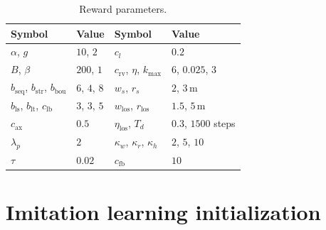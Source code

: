 \documentclass[11pt,a4paper]{article}
\begin{document}
\begin{enumerate}[label=\textbf{\arabic*.},resume]
\begin{table}[h]
\centering
\caption{Reward parameters.}
\label{tab:reward_params}
\begin{tabular}{llll}
\toprule
\textbf{Symbol} & \textbf{Value} & \textbf{Symbol} & \textbf{Value} \\
\midrule
$\alpha$, $g$                        & $10$, $2$          & $c_l$                                 & $0.2$ \\
$B$, $\beta$                         & $200$, $1$         & $c_{\mathrm{rv}}$, $\eta$, $k_{\max}$ & $6$, $0.025$, $3$ \\
$b_{\mathrm{seq}}$, $b_{\mathrm{str}}$, $b_{\mathrm{bou}}$ & $6$, $4$, $8$ & $w_s$, $r_s$       & $2$, $3$\,m \\
$b_{\mathrm{ls}}$, $b_{\mathrm{lt}}$, $c_{\mathrm{lb}}$    & $3$, $3$, $5$ & $w_{\mathrm{los}}$, $r_{\mathrm{los}}$ & $1.5$, $5$\,m \\
$c_{\mathrm{ax}}$                    & $0.5$              & $\eta_{\mathrm{los}}$, $T_d$          & $0.3$, $1500$ steps \\
$\lambda_p$                          & $2$                & $\kappa_w$, $\kappa_r$, $\kappa_h$    & $2$, $5$, $10$ \\
$\tau$                               & $0.02$             & $c_{\mathrm{fb}}$                     & $10$ \\
\bottomrule
\end{tabular}
\end{table}

\end{enumerate}

\section{Imitation learning initialization}
\end{document}
